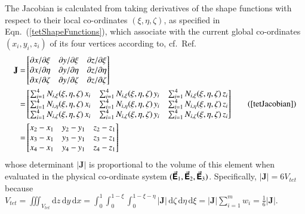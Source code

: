 The Jacobian is calculated from taking derivatives of the shape functions with respect to their local co-ordinates $(\xi, \eta, \zeta)$, as specified in Eqn.~(\ref{tetShapeFunctions}), which associate with the current global co-ordinates $(x_i, y_i, z_i)$ of its four vertices according to, cf.\ Ref.~\cite[pg.~424]{Reddy93}
\begin{equation}
\begin{aligned}
\mathbf{J}= &
\begin{bmatrix}
\partial x / \partial\xi & \partial y / \partial\xi & \partial z / \partial\xi\\
\partial x / \partial\eta & \partial y / \partial\eta & \partial z / \partial\eta \\
\partial x / \partial\zeta & \partial y / \partial\zeta & \partial z / \partial\zeta 
\end{bmatrix} \\
= & \begin{bmatrix}
\sum\nolimits_{i=1}^4 N_{i,\xi} (\xi,\eta,\zeta) \, x_i & \sum\nolimits_{i=1}^4 N_{i,\xi} (\xi,\eta,\zeta) \, y_i &
\sum\nolimits_{i=1}^4 N_{i,\xi} (\xi,\eta,\zeta) \, z_i\\
\sum\nolimits_{i=1}^4 N_{i,\eta} (\xi,\eta,\zeta) \, x_i & \sum\nolimits_{i=1}^4 N_{i,\eta} (\xi,\eta,\zeta) \, y_i &
\sum\nolimits_{i=1}^4 N_{i,\eta} (\xi,\eta,\zeta) \, z_i\\
\sum\nolimits_{i=1}^4 N_{i,\zeta} (\xi,\eta,\zeta) \, x_i & \sum\nolimits_{i=1}^4 N_{i,\zeta} (\xi,\eta,\zeta) \, y_i &
\sum\nolimits_{i=1}^4 N_{i,\zeta} (\xi,\eta,\zeta) \, z_i
\end{bmatrix} \\
= & \begin{bmatrix}
x_2 - x_1 & y_2 - y_1 & z_2 - z_1 \\
x_3 - x_1 & y_3 - y_1 & z_3 - z_1 \\
x_4 - x_1 & y_4 - y_1 & z_4 - z_1
\end{bmatrix}
\end{aligned}
\tag{\ref{tetJacobian}}
\end{equation}
whose determinant $| \mathbf{J} |$ is proportional to the volume of this element when evaluated in the physical co-ordinate system $( \vec{\boldsymbol{\mathsf{E}}}_1 , \vec{\boldsymbol{\mathsf{E}}}_2 , \vec{\boldsymbol{\mathsf{E}}}_3 )$.  Specifically, $| \mathbf{J} | = 6V_{tet}$ because $V_{tet} = \iiint_{V_{tet}} \mathrm{d} z \, \mathrm{d} y \, \mathrm{d} x = \int_0^1 \int_0^{1-\xi} \int_0^{1-\xi-\eta} | \mathbf{J} | \, \mathrm{d} \zeta \, \mathrm{d} \eta \, \mathrm{d} \xi = | \mathbf{J} | \sum_{i=1}^m w_i = \tfrac{1}{6} | \mathbf{J} |$.  

